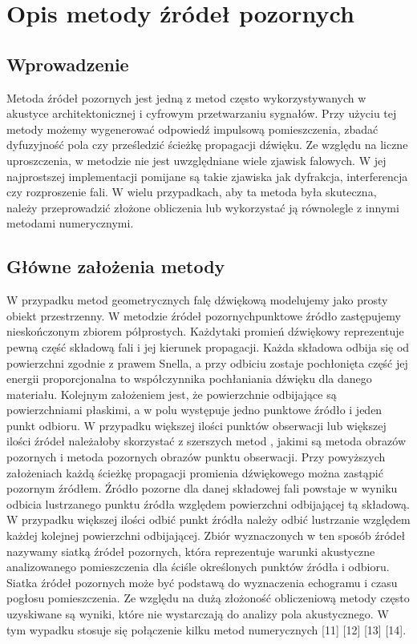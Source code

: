 \chapter{Opis metody źródeł pozornych}\label{cha:ims}


\section{Wprowadzenie}\label{sec:wprowadzenie}

Metoda źródeł pozornych jest jedną z metod często wykorzystywanych w akustyce architektonicznej i cyfrowym przetwarzaniu sygnałów. Przy użyciu tej metody możemy wygenerować odpowiedź impulsową pomieszczenia, zbadać dyfuzyjność pola  czy prześledzić ścieżkę propagacji dźwięku. Ze względu na liczne uproszczenia, w metodzie nie jest uwzględniane wiele zjawisk falowych. W jej najprostszej implementacji pomijane są takie zjawiska jak dyfrakcja, interferencja czy rozproszenie fali. W wielu przypadkach, aby ta metoda była skuteczna, należy przeprowadzić złożone obliczenia lub wykorzystać ją równolegle z innymi metodami numerycznymi.



\section{Główne założenia metody}\label{sec:gzm}

W przypadku metod geometrycznych falę dźwiękową modelujemy jako prosty obiekt przestrzenny. W metodzie źródeł pozornychpunktowe źródło zastępujemy nieskończonym zbiorem półprostych. Każdytaki promień dźwiękowy reprezentuje pewną część składową fali i jej kierunek propagacji. Każda składowa odbija się od powierzchni zgodnie z prawem Snella, a przy odbiciu zostaje pochłonięta część jej energii proporcjonalna to współczynnika pochłaniania dźwięku dla danego materiału. Kolejnym założeniem jest, że powierzchnie odbijające są powierzchniami płaskimi, a w polu występuje jedno  punktowe źródło i jeden punkt odbioru. W przypadku większej ilości punktów obserwacji lub większej ilości źródeł należałoby skorzystać z szerszych metod , jakimi są metoda obrazów pozornych i metoda pozornych obrazów punktu obserwacji. Przy powyższych założeniach  każdą ścieżkę propagacji promienia dźwiękowego można zastąpić pozornym źródłem. Źródło pozorne dla danej składowej fali powstaje w wyniku odbicia lustrzanego punktu źródła względem powierzchni odbijającej tą składową. W przypadku większej ilości odbić punkt źródła należy odbić lustrzanie względem każdej kolejnej powierzchni odbijającej. Zbiór wyznaczonych w ten sposób źródeł nazywamy siatką źródeł pozornych, która reprezentuje warunki akustyczne analizowanego pomieszczenia dla ściśle określonych punktów źródła i odbioru. Siatka źródeł pozornych może być podstawą do wyznaczenia echogramu i czasu pogłosu pomieszczenia. Ze względu na dużą złożoność obliczeniową metody często uzyskiwane są wyniki, które nie wystarczają do analizy pola akustycznego. W tym wypadku stosuje się połączenie kilku metod numerycznych [11] [12] [13] [14].


